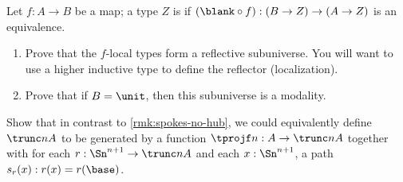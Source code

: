 \begin{ex}\label{ex:f-local-type}
  Let $f:A\to B$ be a map; a type $Z$ is 
  if $(\blank\circ f):(B\to Z) \to (A\to Z)$ is an equivalence.
  \begin{enumerate}
  \item Prove that the $f$-local types form a reflective subuniverse.
    You will want to use a higher inductive type to define the reflector (localization).
  \item Prove that if $B=\unit$, then this subuniverse is a modality.
  \end{enumerate}
\end{ex}

\begin{ex}\label{ex:trunc-spokes-no-hub}
  Show that in contrast to \cref{rmk:spokes-no-hub}, we could equivalently define $\trunc nA$ to be generated by a function $\tprojf n : A \to \trunc n A$ together with for each $r:\Sn^{n+1} \to \trunc n A$ and each $x:\Sn^{n+1}$, a path $s_r(x):r(x) = r(\base)$.
\end{ex}

